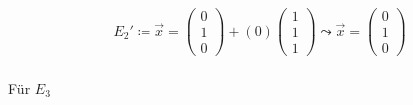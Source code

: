 \begin{gather}
E_2'\coloneqq \vec{x} = \begin{pmatrix}
0\\1\\0
\end{pmatrix}+(0) \begin{pmatrix}
1\\1\\1
\end{pmatrix} 
\leadsto \vec{x} =
\begin{pmatrix}
0\\1\\0
\end{pmatrix}
\end{gather}\\

Für \ensuremath{E_3}  %

